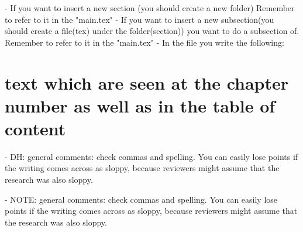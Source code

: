 
- If you want to insert a new section (you should create a new folder)
    Remember to refer to it in the "main.tex"
- If you want to insert a new subsection(you should create a file(tex) under the folder(section)) you want to do a subsection of. 
    Remember to refer to it in the "main.tex"
- In the file you write the following: 
    \chapter{text which are seen at the chapter number as well as in the table of content}\label{chap: if you want to referate to the chapter}
    
- DH: general comments: check commas and spelling. You can easily lose points if the writing comes across as sloppy, because reviewers might assume that the research was also sloppy.

- NOTE: general comments: check commas and spelling. You can easily lose points if the writing comes across as sloppy, because reviewers might assume that the research was also sloppy.


